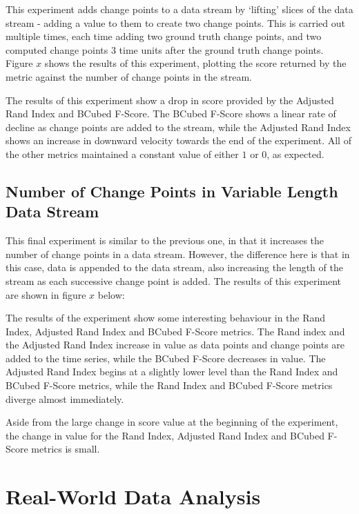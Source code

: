 \documentclass{uvamscse}	%
\begin{document}
This experiment adds change points to a data stream by `lifting' slices of the data stream - adding a value to them to create two change points. This is carried out multiple times, each time adding two ground truth change points, and two computed change points 3 time units after the ground truth change points. Figure $x$ shows the results of this experiment, plotting the score returned by the metric against the number of change points in the stream.


The results of this experiment show a drop in score provided by the Adjusted Rand Index and BCubed F-Score. The BCubed F-Score shows a linear rate of decline as change points are added to the stream, while the Adjusted Rand Index shows an increase in downward velocity towards the end of the experiment. All of the other metrics maintained a constant value of either $1$ or $0$, as expected.

\subsection{Number of Change Points in Variable Length Data Stream}

This final experiment is similar to the previous one, in that it increases the number of change points in a data stream. However, the difference here is that in this case, data is appended to the data stream, also increasing the length of the stream as each successive change point is added. The results of this experiment are shown in figure $x$ below:


The results of the experiment show some interesting behaviour in the Rand Index, Adjusted Rand Index and BCubed F-Score metrics. The Rand index and the Adjusted Rand Index increase in value as data points and change points are added to the time series, while the BCubed F-Score decreases in value. The Adjusted Rand Index begins at a slightly lower level than the Rand Index and BCubed F-Score metrics, while the Rand Index and BCubed F-Score metrics diverge almost immediately.

Aside from the large change in score value at the beginning of the experiment, the change in value for the Rand Index, Adjusted Rand Index and BCubed F-Score metrics is small.

\section{Real-World Data Analysis}
\end{document}
